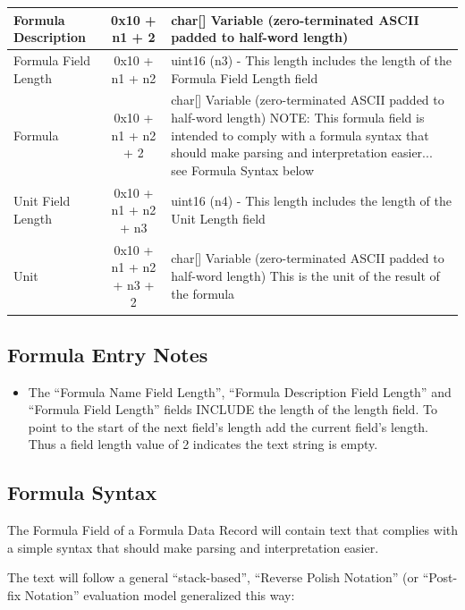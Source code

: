 \documentclass[14]{article}
\begin{document}
\begin{tabular}[l]{|p{5cm}|c|p{7cm}|}
  \hline
  Formula Description & 0x10 + n1 + 2 & char[] Variable (zero-terminated ASCII
                                        padded to half-word length) \\ \hline
  Formula Field Length & 0x10 + n1 + n2 & uint16 (n3) - This length includes the
                                          length of the Formula Field Length
                                          field \\ \hline
  Formula & 0x10 + n1 + n2 + 2 & char[] Variable (zero-terminated ASCII padded to
                                 half-word length) NOTE: This formula field is
                                 intended to comply with a formula syntax that
                                 should make parsing and interpretation
                                 easier... see Formula Syntax below \\ \hline
  Unit Field Length & 0x10 + n1 + n2 + n3 & uint16 (n4) - This length includes
                                            the length of the Unit Length field
  \\ \hline
  Unit & 0x10 + n1 + n2 + n3 + 2 & char[] Variable (zero-terminated ASCII padded to
                                   half-word length) This is the unit of the
                                   result of the formula \\ \hline

\end{tabular}

\subsection{Formula Entry Notes}
\begin{itemize}
\item The ``Formula Name Field Length'', ``Formula Description Field Length'' and
  ``Formula Field Length'' fields INCLUDE the length of the length field. To point
  to the start of the next field's length add the current field's length. Thus a
  field length value of 2 indicates the text string is empty.
\end{itemize}

\subsection{Formula Syntax}
The Formula Field of a Formula Data Record will contain text that complies with
a simple syntax that should make parsing and interpretation easier.

The text will follow a general ``stack-based'', ``Reverse Polish Notation'' (or
``Post-fix Notation'' evaluation model generalized this way:
\end{document}
